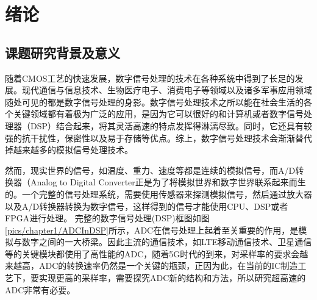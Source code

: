 


\chapter{绪论}

	
\section {课题研究背景及意义}
	随着CMOS工艺的快速发展，数字信号处理的技术在各种系统中得到了长足的发展。现代通信与信息技术、生物医疗电子、消费电子等领域以及诸多军事应用领域随处可见的都是数字信号处理的身影。数字信号处理技术之所以能在社会生活的各个关键领域都有着极为广泛的应用，是因为它可以很好的和计算机或者数字信号处理器（DSP）结合起来，将其灵活高速的特点发挥得淋漓尽致。同时，它还具有较强的抗干扰性，保密性以及易于存储等优点。综上，数字信号处理技术会渐渐替代掉越来越多的模拟信号处理技术。\par
	然而，现实世界的信号，如温度、重力、速度等都是连续的模拟信号，而A/D转换器（Analog to Digital Converter正是为了将模拟世界和数字世界联系起来而生的。一个完整的信号处理系统，需要使用传感器来探测模拟信号，然后通过放大器以及A/D转换器转换为数字信号，这样得到的信号才能使用CPU、DSP或者FPGA进行处理。
	完整的数字信号处理(DSP)框图如图\ref{pics/chapter1/ADCInDSP}所示，ADC在信号处理上起着至关重要的作用，是模拟与数字之间的一大桥梁。因此主流的通信技术，如LTE移动通信技术、卫星通信等的关键模块都使用了高性能的ADC，随着5G时代的到来，对采样率的要求会越来越高，ADC的转换速率仍然是一个关键的瓶颈，正因为此，在当前的IC制造工艺下，要实现更高的采样率，需要探究ADC新的结构和方法，所以研究超高速的ADC非常有必要。\par
	
	
